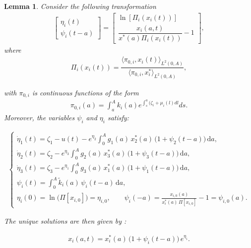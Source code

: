 \documentclass[10pt, a4paper]{amsart}
\theoremstyle{plain}
\newtheorem{lemma}{Lemma}[section]
\theoremstyle{definition}
\theoremstyle{remark}
\numberwithin{equation}{section}
\begin{document}
\begin{lemma}\label{lee3.1}
Consider the following transformation
\begin{align}\label{e3.7}
 \left[\begin{array}{c}
\eta_i(t) \\ 
\psi_i(t-a)
\end{array}  \right]=\left[\begin{array}{c}
\ln[\Pi_i(x_i(t))] \\ 
\dfrac{x_i(a,t)}{x^*(a)\Pi_i(x_i(t))}-1
\end{array} \right],%
\end{align}
where
\begin{align}\label{e3.8}
\Pi_i(x_i(t))=\dfrac{\langle \pi_{0,i}, x_i(t)\rangle_{L^2(0,A)}}{\langle\pi_{0,i}, x_i^*\rangle_{L^2(0,A)}},
\end{align}

with  $\pi_{0,i}$ is continuous functions of the form
\begin{align}\label{e3.9}
   \pi_{0,i}(a)= \displaystyle\int_a^{A}k_i(a)e^{\int_s^a(\zeta_i+\mu_i(l)dl}ds.
\end{align}
Moreover, the variables $\psi_i$ and $\eta_i$ satisfy:


\begin{align}\label{e3.10}
    \begin{cases}
\dot{\eta}_1(t)
= \zeta_1 - u(t)
  - e^{\eta_2} \displaystyle\int_0^A g_1(a)\,x^*_2(a)\,\bigl(1 + \psi_2(t-a)\bigr)\,\mathrm{d}a,\\
\dot{\eta}_2(t)
= \zeta_2 
  - e^{\eta_3} \displaystyle\int_0^A g_2(a)\,x^*_3(a)\,\bigl(1 + \psi_3(t-a)\bigr)\,\mathrm{d}a,\\
  \dot{\eta}_3(t)
= \zeta_3
  - e^{\eta_1} \displaystyle\int_0^A g_3(a)\,x^*_1(a)\,\bigl(1 + \psi_1(t-a)\bigr)\,\mathrm{d}a,\\
\psi_i(t)= \displaystyle\int_0^A \tilde k_i(a)\,\psi_i(t-a)\,\mathrm{d}a,\\
\eta_i(0)
= \ln\bigl(\Pi[x_{i,0}]\bigr) = \eta_{i,0},\qquad
\psi_i(-a)
= \frac{x_{i,0}(a)}{x_i^*(a)\,\Pi[x_{i,0}]} - 1 = \psi_{i,0}(a).
\end{cases}
\end{align}

The unique solutions are then given by :

\begin{align}\label{e3.11}
x_i(a,t)
={x}_i^{*}(a)\,\bigl(1+\psi_{i}(t-a)\bigr)\,e^{\eta_{i}}.
\end{align}
\end{lemma}
\end{document}
